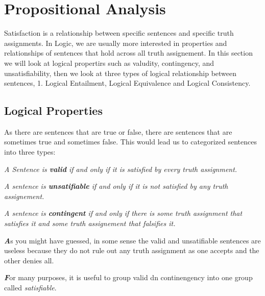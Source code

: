 \documentclass[10pt,a4pape,twocolumn]{article}
\newenvironment{callout}
	{\begin{calloutbox}\color{charcoal}\textbf\textit}
	{\end{calloutbox}}
\begin{document}
        \section{Propositional Analysis}
            Satisfaction is a relationship between specific sentences and specific truth assignments. In Logic, we are usually more interested in properties and relationships of sentences that hold across all truth assignement. In this section we will look at logical propertirs such as valudity, contingency, and unsatisfiability, then we look at three types of logical relationship between sentences, 1. Logical Entailment, Logical Equivalence and Logical Consistency.
            \subsection{Logical Properties}
                As there are sentences that are true or false, there are sentences that are sometimes true and sometimes false. This would lead us to categorized sentences into three types:
                \begin{define}
                    \textit{A Sentence is \textbf{valid} if and only if it is satisfied by every truth assignment.}
                \end{define}
                \begin{define}
                    \textit{A sentence is \textbf{unsatifiable} if and only if it is not satisfied by any truth assignement.}
                \end{define}
                \begin{define}
                    \textit{A sentence is \textbf{contingent} if and only if there is some truth assignment that satisfies it and some truth assignement that falsifies it.}
                \end{define}
                \begin{callout}
                    As you might have guessed, in some sense the valid and unsatifiable sentences are useless because they do not rule out any truth assignment as one accepts and the other denies all.
                \end{callout}
                \begin{callout}
                    For many purposes, it is useful to group valid dn continengency into one group called \textit{satisfiable}.
                \end{callout}
\end{document}
